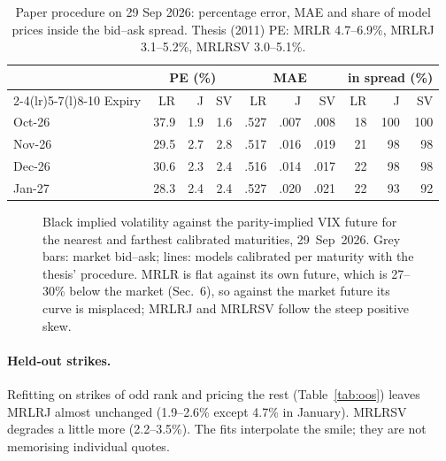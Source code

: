 \documentclass[10pt,twocolumn]{article}
\begin{document}
\begin{table}[t]
\centering\small
\caption{Paper procedure on 29 Sep 2026: percentage error, MAE and share of
model prices inside the bid--ask spread. Thesis (2011) PE: MRLR 4.7--6.9\%,
MRLRJ 3.1--5.2\%, MRLRSV 3.0--5.1\%.}
\label{tab:fit}
\setlength{\tabcolsep}{3pt}
\begin{tabular}{@{}l rrr rrr rrr@{}}
\toprule
 & \multicolumn{3}{c}{PE (\%)} & \multicolumn{3}{c}{MAE} & \multicolumn{3}{c}{in spread (\%)}\\
\cmidrule(lr){2-4}\cmidrule(lr){5-7}\cmidrule(l){8-10}
Expiry & LR & J & SV & LR & J & SV & LR & J & SV\\
\midrule
Oct-26 & 37.9 & 1.9 & 1.6 & .527 & .007 & .008 & 18 & 100 & 100\\
Nov-26 & 29.5 & 2.7 & 2.8 & .517 & .016 & .019 & 21 & 98 & 98\\
Dec-26 & 30.6 & 2.3 & 2.4 & .516 & .014 & .017 & 22 & 98 & 98\\
Jan-27 & 28.3 & 2.4 & 2.4 & .527 & .020 & .021 & 22 & 93 & 92\\
\bottomrule
\end{tabular}
\end{table}

\begin{figure}[t]
\centering
\hspace{0.9cm}

\caption{Black implied volatility against the parity-implied VIX future for the
nearest and farthest calibrated maturities, 29~Sep~2026. Grey bars: market bid--ask;
lines: models calibrated per maturity with the thesis' procedure. MRLR is flat
against its own future, which is 27--30\% below the market (Sec.~6), so against the market
future its curve is misplaced; MRLRJ and MRLRSV follow the steep positive skew.}
\label{fig:skew}
\end{figure}

\paragraph{Held-out strikes.} Refitting on strikes of odd rank and pricing the rest
(Table~\ref{tab:oos}) leaves MRLRJ almost unchanged (1.9--2.6\% except 4.7\% in
January). MRLRSV degrades a little more (2.2--3.5\%). The fits interpolate the
smile; they are not memorising individual quotes.
\end{document}
